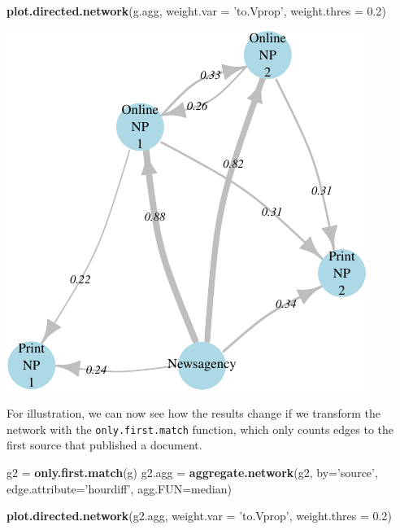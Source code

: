 \documentclass[]{article}
\newenvironment{Shaded}{\begin{snugshade}}{\end{snugshade}}
\newcommand{\KeywordTok}[1]{\textcolor[rgb]{0.13,0.29,0.53}{\textbf{{#1}}}}
\newcommand{\DataTypeTok}[1]{\textcolor[rgb]{0.13,0.29,0.53}{{#1}}}
\newcommand{\FloatTok}[1]{\textcolor[rgb]{0.00,0.00,0.81}{{#1}}}
\newcommand{\StringTok}[1]{\textcolor[rgb]{0.31,0.60,0.02}{{#1}}}
\newcommand{\NormalTok}[1]{{#1}}
\begin{document}
\begin{Shaded}
\begin{Highlighting}[]
\KeywordTok{plot.directed.network}\NormalTok{(g.agg, }\DataTypeTok{weight.var =} \StringTok{'to.Vprop'}\NormalTok{,}
                       \DataTypeTok{weight.thres =} \FloatTok{0.2}\NormalTok{)}
\end{Highlighting}
\end{Shaded}

\begin{center}\includegraphics{vignette_files/figure-latex/unnamed-chunk-20-1} \end{center}

For illustration, we can now see how the results change if we transform
the network with the \texttt{only.first.match} function, which only
counts edges to the first source that published a document.

\begin{Shaded}
\begin{Highlighting}[]
\NormalTok{g2 =}\StringTok{ }\KeywordTok{only.first.match}\NormalTok{(g)}
\NormalTok{g2.agg =}\StringTok{ }\KeywordTok{aggregate.network}\NormalTok{(g2, }\DataTypeTok{by=}\StringTok{'source'}\NormalTok{, }\DataTypeTok{edge.attribute=}\StringTok{'hourdiff'}\NormalTok{, }\DataTypeTok{agg.FUN=}\NormalTok{median)}

\KeywordTok{plot.directed.network}\NormalTok{(g2.agg, }\DataTypeTok{weight.var =} \StringTok{'to.Vprop'}\NormalTok{,}
                       \DataTypeTok{weight.thres =} \FloatTok{0.2}\NormalTok{)}
\end{Highlighting}
\end{Shaded}
\end{document}
